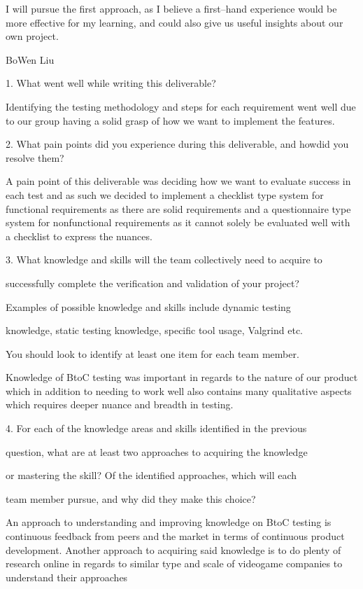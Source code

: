 \documentclass[12pt, titlepage]{article}
\begin{document}
I will pursue the first approach, as I believe a first--hand experience would be more effective for my learning, and could also give us useful insights about our own project.

BoWen Liu

1. What went well while writing this deliverable?

Identifying the testing methodology and steps for each requirement went well due to our group having a solid grasp of how we want to implement the features.

2. What pain points did you experience during this deliverable, and howdid you resolve them?

A pain point of this deliverable was deciding how we want to evaluate success in each test and as such we decided to implement a checklist type system for functional requirements as there are solid requirements and a questionnaire type system for nonfunctional requirements as it cannot solely be evaluated well with a checklist to express the nuances.

3. What knowledge and skills will the team collectively need to acquire to

successfully complete the verification and validation of your project?

Examples of possible knowledge and skills include dynamic testing

knowledge, static testing knowledge, specific tool usage, Valgrind etc.

You should look to identify at least one item for each team member.

Knowledge of BtoC testing was important in regards to the nature of our product which in addition to needing to work well also contains many qualitative aspects which requires deeper nuance and breadth in testing.

4. For each of the knowledge areas and skills identified in the previous

question, what are at least two approaches to acquiring the knowledge

or mastering the skill? Of the identified approaches, which will each

team member pursue, and why did they make this choice?

An approach to understanding and improving knowledge on BtoC testing is continuous feedback from peers and the market in terms of continuous product development. Another approach to acquiring said knowledge is to do plenty of research online in regards to similar type and scale of videogame companies to understand their approaches
\end{document}
